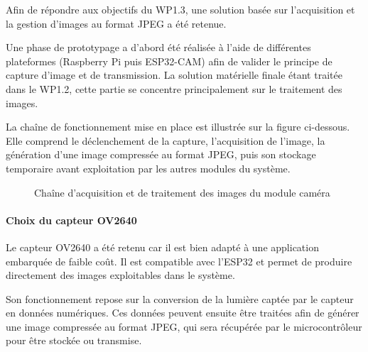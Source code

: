 ﻿\documentclass[11pt]{article}
\begin{document}
Afin de répondre aux objectifs du WP1.3, une solution basée sur l’acquisition et la gestion d’images au format JPEG a été retenue.

Une phase de prototypage a d’abord été réalisée à l’aide de différentes plateformes (Raspberry Pi puis ESP32-CAM) afin de valider le principe de capture d’image et de transmission. La solution matérielle finale étant traitée dans le WP1.2, cette partie se concentre principalement sur le traitement des images.

La chaîne de fonctionnement mise en place est illustrée sur la figure ci-dessous. Elle comprend le déclenchement de la capture, l’acquisition de l’image, la génération d’une image compressée au format JPEG, puis son stockage temporaire avant exploitation par les autres modules du système.

\begin{figure}[H]
\centering
{}
\caption{Chaîne d’acquisition et de traitement des images du module caméra}
\end{figure}

\FloatBarrier

\paragraph{Choix du capteur OV2640}

Le capteur OV2640 a été retenu car il est bien adapté à une application embarquée de faible coût. Il est compatible avec l’ESP32 et permet de produire directement des images exploitables dans le système.

Son fonctionnement repose sur la conversion de la lumière captée par le capteur en données numériques. Ces données peuvent ensuite être traitées afin de générer une image compressée au format JPEG, qui sera récupérée par le microcontrôleur pour être stockée ou transmise.
\end{document}
